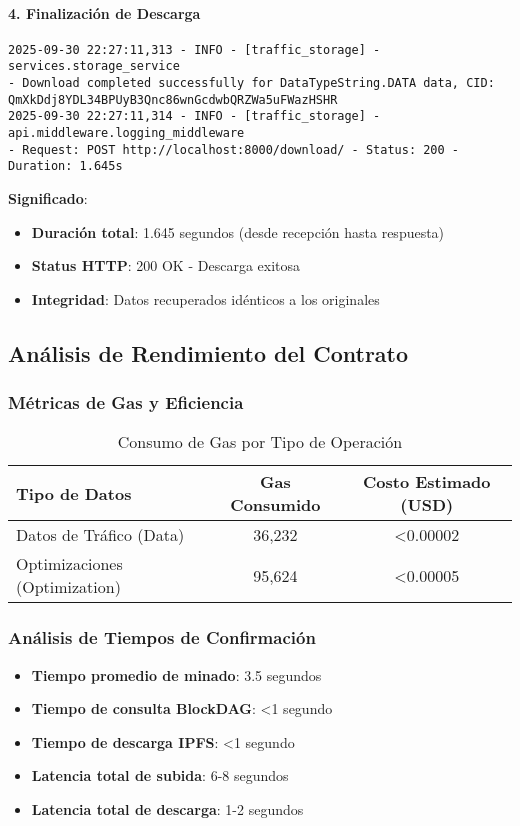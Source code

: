 \documentclass[onecolumn]{article}
\begin{document}
\paragraph{4. Finalización de Descarga}
\begin{verbatim}
2025-09-30 22:27:11,313 - INFO - [traffic_storage] - services.storage_service 
- Download completed successfully for DataTypeString.DATA data, CID: QmXkDdj8YDL34BPUyB3Qnc86wnGcdwbQRZWa5uFWazHSHR
2025-09-30 22:27:11,314 - INFO - [traffic_storage] - api.middleware.logging_middleware 
- Request: POST http://localhost:8000/download/ - Status: 200 - Duration: 1.645s
\end{verbatim}
\textbf{Significado}:
\begin{itemize}
    \item \textbf{Duración total}: 1.645 segundos (desde recepción hasta respuesta)
    \item \textbf{Status HTTP}: 200 OK - Descarga exitosa
    \item \textbf{Integridad}: Datos recuperados idénticos a los originales
\end{itemize}

\subsection{Análisis de Rendimiento del Contrato}

\subsubsection{Métricas de Gas y Eficiencia}

\begin{table}[H]
\centering
\caption{Consumo de Gas por Tipo de Operación}
\begin{tabular}{@{}lcc@{}}
\toprule
\textbf{Tipo de Datos} & \textbf{Gas Consumido} & \textbf{Costo Estimado (USD)} \\
\midrule
Datos de Tráfico (Data) & 36,232 & <0.00002 \\
Optimizaciones (Optimization) & 95,624 & <0.00005 \\
\bottomrule
\end{tabular}
\end{table}

\subsubsection{Análisis de Tiempos de Confirmación}

\begin{itemize}
    \item \textbf{Tiempo promedio de minado}: 3.5 segundos
    \item \textbf{Tiempo de consulta BlockDAG}: <1 segundo
    \item \textbf{Tiempo de descarga IPFS}: <1 segundo
    \item \textbf{Latencia total de subida}: 6-8 segundos
    \item \textbf{Latencia total de descarga}: 1-2 segundos
\end{itemize}
\end{document}
